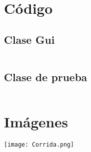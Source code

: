\documentclass{article}
\begin{document}
\section*{Código}

\subsection*{ Clase Gui }
\inputminted[lineos]{Java}{Gui.java}

\subsection*{ Clase de prueba }
\inputminted[lineos]{Java}{Prueba_Gui.java}

\section*{ Imágenes }
\texttt{[image: Corrida.png]}
\end{document}
